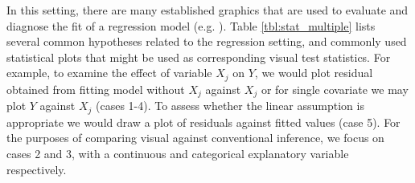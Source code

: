 \documentclass[12pt]{article}
\begin{document}
In this setting, there are many established graphics that are used to evaluate and diagnose the fit of a regression model (e.g. \citet{cook:99}). Table \ref{tbl:stat_multiple} lists several common hypotheses related to the regression setting, and commonly used statistical plots that might be used as corresponding visual test statistics.
For example, to examine the effect of variable $X_j$ on $Y$, we would plot residual obtained from fitting model without $X_j$ against $X_j$ or for single covariate we may plot $Y$ against $X_j$ (cases 1-4). To assess whether the linear assumption is appropriate we would draw a plot of residuals against fitted values (case 5). For the purposes of comparing visual against conventional inference, we focus on cases 2 and 3, with a continuous and categorical explanatory variable respectively. 

\end{document}
